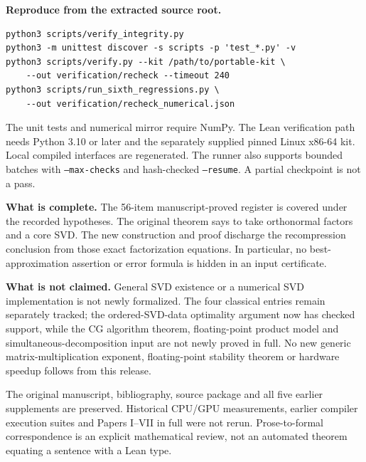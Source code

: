 \textbf{Reproduce from the extracted source root.}
\begin{verbatim}
python3 scripts/verify_integrity.py
python3 -m unittest discover -s scripts -p 'test_*.py' -v
python3 scripts/verify.py --kit /path/to/portable-kit \
    --out verification/recheck --timeout 240
python3 scripts/run_sixth_regressions.py \
    --out verification/recheck_numerical.json
\end{verbatim}
The unit tests and numerical mirror require NumPy. The Lean verification path needs Python 3.10 or later and the separately supplied pinned Linux x86-64 kit. Local compiled interfaces are regenerated. The runner also supports bounded batches with \texttt{--max-checks} and hash-checked \texttt{--resume}. A partial checkpoint is not a pass.

\textbf{What is complete.} The 56-item manuscript-proved register is covered under the recorded hypotheses. The original theorem says to take orthonormal factors and a core SVD. The new construction and proof discharge the recompression conclusion from those exact factorization equations. In particular, no best-approximation assertion or error formula is hidden in an input certificate.

\textbf{What is not claimed.} General SVD existence or a numerical SVD implementation is not newly formalized. The four classical entries remain separately tracked; the ordered-SVD-data optimality argument now has checked support, while the CG algorithm theorem, floating-point product model and simultaneous-decomposition input are not newly proved in full. No new generic matrix-multiplication exponent, floating-point stability theorem or hardware speedup follows from this release.

The original manuscript, bibliography, source package and all five earlier supplements are preserved. Historical CPU/GPU measurements, earlier compiler execution suites and Papers I--VII in full were not rerun. Prose-to-formal correspondence is an explicit mathematical review, not an automated theorem equating a sentence with a Lean type.
